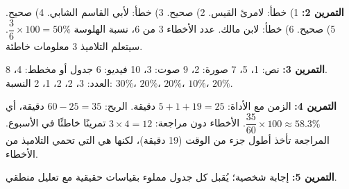 \documentclass[a4paper]{article}
\begin{document}
\textbf{التمرين 2:}
1) خطأ: لامرئ القيس. 2) صحيح. 3) خطأ: لأبي القاسم الشابي. 4) صحيح. 5) صحيح.
6) خطأ: لابن مالك.
عدد الأخطاء 3 من 6، نسبة الهلوسة $\dfrac{3}{6}\times 100 = 50\%$.
سيتعلم التلاميذ 3 معلومات خاطئة.

\textbf{التمرين 3:}
نص: 1، 5، 7 \quad صورة: 2، 9 \quad صوت: 3، 10 \quad فيديو: 6 \quad جدول أو مخطط: 4، 8.\\
العدد: 3، 2، 2، 1، 2 \quad النسبة: $30\%$، $20\%$، $20\%$، $10\%$، $20\%$.

\textbf{التمرين 4:}
الزمن مع الأداة: $5 + 1 + 19 = 25$ دقيقة.
الربح: $60 - 25 = 35$ دقيقة، أي $\dfrac{35}{60}\times 100 \approx 58.3\%$.
الأخطاء دون مراجعة: $3 \times 4 = 12$ تمرينًا خاطئًا في الأسبوع.
المراجعة تأخذ أطول جزء من الوقت (19 دقيقة)، لكنها هي التي تحمي التلاميذ من الأخطاء.

\textbf{التمرين 5:} إجابة شخصية؛ يُقبل كل جدول مملوء بقياسات حقيقية مع تعليل منطقي.
\end{document}
